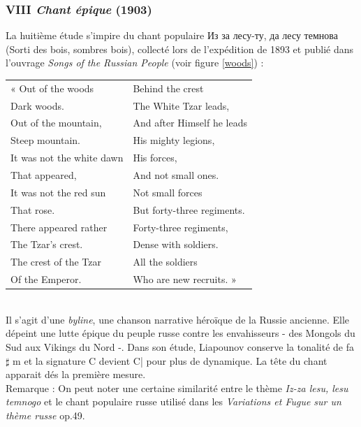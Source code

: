 \subsubsection{VIII \emph{Chant épique} (1903)}

La huitième étude s'impire du chant populaire \foreignlanguage{russian}{Из за лесу-ту, да лесу темнова} (Sorti des bois, sombres bois), collecté lors de l'expédition de 1893 et publié dans l'ouvrage \emph{Songs of the Russian People} (voir figure \ref{woods}) :\\

\begin{tabular}{ll}
\hspace{-3.9mm}« Out of the woods
&
Behind the crest
\\
  \quad{}Dark woods.
&
  \quad{}The White Tzar leads,
\\
Out of the mountain,
&
And after Himself he leads
\\
  \quad{}Steep mountain.
&
  \quad{}His mighty legions,
\\
It was not the white dawn
&
His forces,
\\
  \quad{}That appeared,
&
  \quad{}And not small ones.
\\
It was not the red sun
&
Not small forces
\\
  \quad{}That rose.
&
  \quad{}But forty-three regiments.
\\
There appeared rather
&
Forty-three regiments,
\\
  \quad{}The Tzar’s crest.
&
  \quad{}Dense with soldiers.
\\
The crest of the Tzar
&
All the soldiers
\\
  \quad{}Of the Emperor.
&
  \quad{}Who are new recruits. »
\end{tabular}\\

Il s'agit d'une \emph{byline}, une chanson narrative héroïque de la Russie ancienne. Elle dépeint une lutte épique du peuple russe contre les envahisseurs - des Mongols du Sud aux Vikings du Nord -. Dans son étude, Liapounov conserve la tonalité de fa$\sharp$ m et la signature C devient C\hspace{-2mm}|\hspace{+2mm} pour plus de dynamique. La tête du chant apparait dés la première mesure.\\

Remarque : On peut noter une certaine similarité entre le thème \emph{Iz-za lesu, lesu temnogo} et le chant populaire russe utilisé dans les \emph{Variations et Fugue sur un thème russe} op.49.

